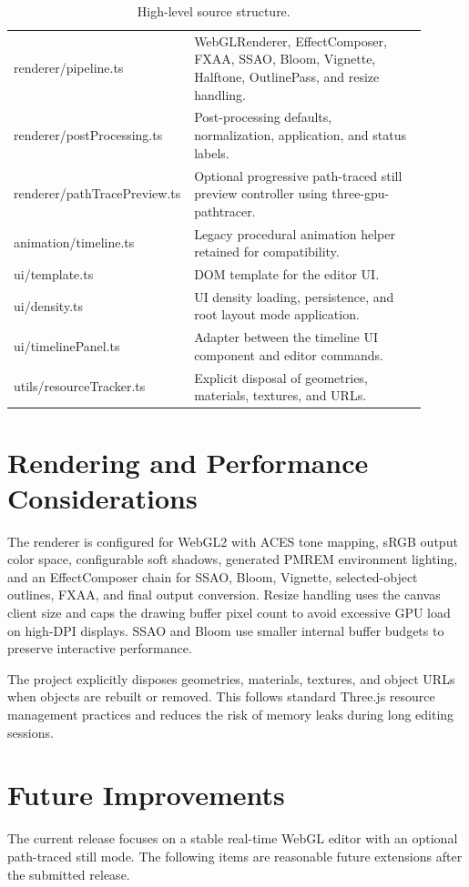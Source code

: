 \documentclass[12pt,a4paper]{article}
\begin{document}
\begin{table}[h]
\begin{tabular}{>{\ttfamily}p{0.34\linewidth}p{0.56\linewidth}}
renderer/pipeline.ts & WebGLRenderer, EffectComposer, FXAA, SSAO, Bloom, Vignette, Halftone, OutlinePass, and resize handling. \\
renderer/postProcessing.ts & Post-processing defaults, normalization, application, and status labels. \\
renderer/pathTracePreview.ts & Optional progressive path-traced still preview controller using three-gpu-pathtracer. \\
animation/timeline.ts & Legacy procedural animation helper retained for compatibility. \\
ui/template.ts & DOM template for the editor UI. \\
ui/density.ts & UI density loading, persistence, and root layout mode application. \\
ui/timelinePanel.ts & Adapter between the timeline UI component and editor commands. \\
utils/resourceTracker.ts & Explicit disposal of geometries, materials, textures, and URLs. \\
\bottomrule
\end{tabular}
\caption{High-level source structure.}
\end{table}

\section{Rendering and Performance Considerations}

The renderer is configured for WebGL2 with ACES tone mapping, sRGB output color
space, configurable soft shadows, generated PMREM environment lighting, and an
EffectComposer chain for SSAO, Bloom, Vignette, selected-object outlines, FXAA,
and final output conversion. Resize handling uses the canvas client size and
caps the drawing buffer pixel count to avoid excessive GPU load on high-DPI
displays. SSAO and Bloom use smaller internal buffer budgets to preserve
interactive performance.

The project explicitly disposes geometries, materials, textures, and object URLs
when objects are rebuilt or removed. This follows standard Three.js resource
management practices and reduces the risk of memory leaks during long editing
sessions.

\section{Future Improvements}

The current release focuses on a stable real-time WebGL editor with an optional
path-traced still mode. The following items are reasonable future extensions
after the submitted release.
\end{document}
